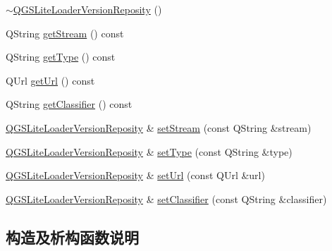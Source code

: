 \begin{DoxyCompactItemize}
\mbox{\hyperlink{class_q_g_s_lite_loader_version_reposity_a8252cc0af901a5db5811ee2f76cc473e}{$\sim$\+Q\+G\+S\+Lite\+Loader\+Version\+Reposity}} ()
\item 
Q\+String \mbox{\hyperlink{class_q_g_s_lite_loader_version_reposity_a0bf43ec700d37fc6920073dd76b12989}{get\+Stream}} () const
\item 
Q\+String \mbox{\hyperlink{class_q_g_s_lite_loader_version_reposity_a71f302c8703866ec8245821a2fee5eb5}{get\+Type}} () const
\item 
Q\+Url \mbox{\hyperlink{class_q_g_s_lite_loader_version_reposity_abbdd0ad97c3ea401be363c4c0aa0d879}{get\+Url}} () const
\item 
Q\+String \mbox{\hyperlink{class_q_g_s_lite_loader_version_reposity_a73caaa576e3ce31ccd642b7725891c9d}{get\+Classifier}} () const
\item 
\mbox{\hyperlink{class_q_g_s_lite_loader_version_reposity}{Q\+G\+S\+Lite\+Loader\+Version\+Reposity}} \& \mbox{\hyperlink{class_q_g_s_lite_loader_version_reposity_a121dcb273fc6a396cea1d7dfc288188e}{set\+Stream}} (const Q\+String \&stream)
\item 
\mbox{\hyperlink{class_q_g_s_lite_loader_version_reposity}{Q\+G\+S\+Lite\+Loader\+Version\+Reposity}} \& \mbox{\hyperlink{class_q_g_s_lite_loader_version_reposity_a0b8f42a964b28e08f3d726bfd26b8b4c}{set\+Type}} (const Q\+String \&type)
\item 
\mbox{\hyperlink{class_q_g_s_lite_loader_version_reposity}{Q\+G\+S\+Lite\+Loader\+Version\+Reposity}} \& \mbox{\hyperlink{class_q_g_s_lite_loader_version_reposity_a4d12b6457ac6026f0511268bd1b97c6c}{set\+Url}} (const Q\+Url \&url)
\item 
\mbox{\hyperlink{class_q_g_s_lite_loader_version_reposity}{Q\+G\+S\+Lite\+Loader\+Version\+Reposity}} \& \mbox{\hyperlink{class_q_g_s_lite_loader_version_reposity_a8a033e4c1213634199c4a70a7263c0d6}{set\+Classifier}} (const Q\+String \&classifier)
\end{DoxyCompactItemize}


\subsection{构造及析构函数说明}
\mbox{\label{class_q_g_s_lite_loader_version_reposity_af4500211910c5bd395d2db052d942372}} 
